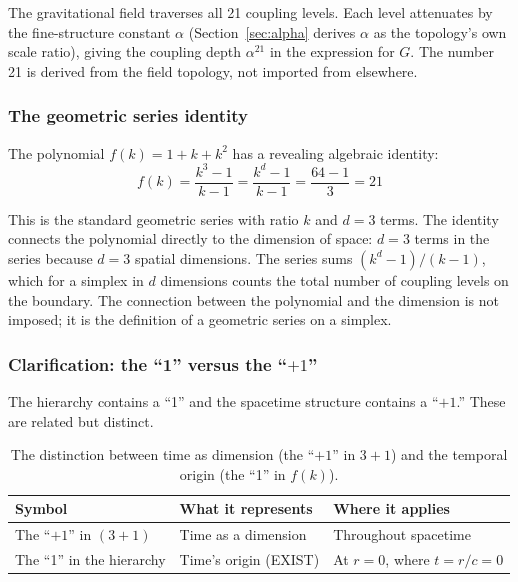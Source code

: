 \documentclass[aps,prd,preprint,superscriptaddress,showpacs,preprintnumbers,amsmath,amssymb,nofootinbib]{revtex4-2}
\begin{document}
The gravitational field traverses all 21 coupling levels. Each level attenuates by the fine-structure constant $\alpha$ (Section~\ref{sec:alpha} derives $\alpha$ as the topology's own scale ratio), giving the coupling depth $\alpha^{21}$ in the expression for $G$. The number 21 is derived from the field topology, not imported from elsewhere.

\subsubsection*{The geometric series identity}

The polynomial $f(k) = 1 + k + k^2$ has a revealing algebraic identity:
\begin{equation}
f(k) = \frac{k^3 - 1}{k - 1} = \frac{k^d - 1}{k - 1} = \frac{64 - 1}{3} = 21
\label{eq:geometric-series}
\end{equation}

This is the standard geometric series with ratio $k$ and $d = 3$ terms. The identity connects the polynomial directly to the dimension of space: $d = 3$ terms in the series because $d = 3$ spatial dimensions. The series sums $(k^d - 1)/(k - 1)$, which for a simplex in $d$ dimensions counts the total number of coupling levels on the boundary. The connection between the polynomial and the dimension is not imposed; it is the definition of a geometric series on a simplex.

\subsubsection*{Clarification: the ``1'' versus the ``$+1$''}

The hierarchy contains a ``1'' and the spacetime structure contains a ``$+1$.'' These are related but distinct.

\begin{table}[H]
\centering
\begin{tabular*}{0.95\textwidth}{@{\extracolsep{\fill}} lll @{}}
\toprule
\textbf{Symbol} & \textbf{What it represents} & \textbf{Where it applies} \\
\midrule
The ``$+1$'' in $(3{+}1)$ & Time as a dimension & Throughout spacetime \\
The ``1'' in the hierarchy & Time's origin (EXIST) & At $r = 0$, where $t = r/c = 0$ \\
\bottomrule
\end{tabular*}
\caption{The distinction between time as dimension (the ``$+1$'' in $3{+}1$) and the temporal origin (the ``1'' in $f(k)$).}
\label{tab:one-vs-plusone}
\end{table}
\end{document}
